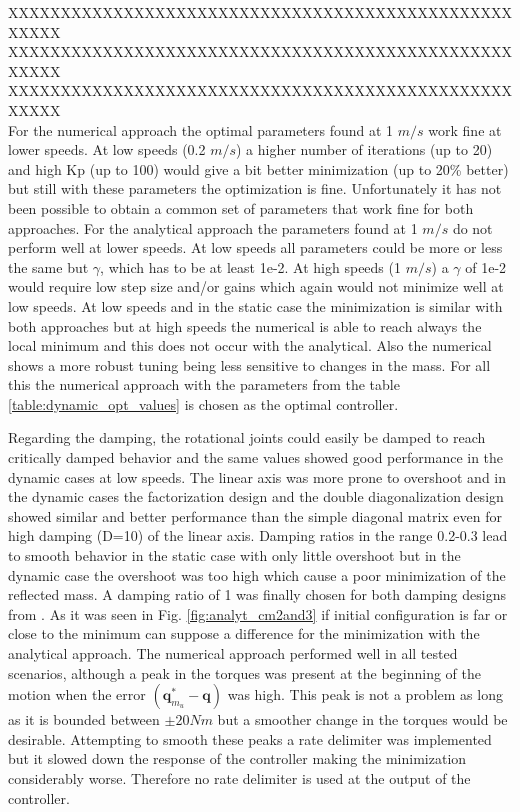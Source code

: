 XXXXXXXXXXXXXXXXXXXXXXXXXXXXXXXXXXXXXXXXXXXXXXXXXXXXX \\ 
XXXXXXXXXXXXXXXXXXXXXXXXXXXXXXXXXXXXXXXXXXXXXXXXXXXXX \\ 
XXXXXXXXXXXXXXXXXXXXXXXXXXXXXXXXXXXXXXXXXXXXXXXXXXXXX \\ 

For the numerical approach the optimal parameters found at 1 $m/s$ work fine at lower speeds. At low speeds (0.2 $m/s$) a higher number of iterations (up to 20) and high Kp (up to 100) would give a bit better minimization (up to 20\% better) but still with these parameters the optimization is fine.
%
Unfortunately it has not been possible to obtain a common set of parameters that work fine for both approaches. For the analytical approach the parameters found at 1 $m/s$ do not perform well at lower speeds. At low speeds all parameters could be more or less the same but $\gamma$, which has to be at least 1e-2. At high speeds (1 $m/s$) a $\gamma$ of 1e-2 would require low step size and/or gains which again would not minimize well at low speeds. 
%
At low speeds and in the static case the minimization is similar with both approaches but at high speeds the numerical is able to reach always the local minimum and this does not occur with the analytical. Also the numerical shows a more robust tuning being less sensitive to changes in the mass. For all this the numerical approach with the parameters from the table \ref{table:dynamic_opt_values} is chosen as the optimal controller.


Regarding the damping, the rotational joints could easily be damped to reach critically damped behavior and the same values showed good performance in the dynamic cases at low speeds. The linear axis was more prone to overshoot and in the dynamic cases the factorization design and the double diagonalization design showed similar and better performance than the simple diagonal matrix even for high damping (D=10) of the linear axis. 
Damping ratios in the range 0.2-0.3 lead to smooth behavior in the static case with only little overshoot but in the dynamic case the overshoot was too high which cause a poor minimization of the reflected mass. A damping ratio of 1 was finally chosen for both damping designs from \cite{alin_damping}.
%
As it was seen in Fig.	\ref{fig:analyt_cm2and3} if initial configuration is far or close to the minimum can suppose a difference for the minimization with the analytical approach. The numerical approach performed well in all tested scenarios, although a peak in the torques was present at the beginning of the motion when the error $(\mathbf{q}_{m_u}^\ast - \mathbf{q})$ was high. This peak is not a problem as long as it is bounded between $\pm 20 Nm$ but a smoother change in the torques would be desirable. Attempting to smooth these peaks a rate delimiter was implemented but it slowed down the response of the controller making the minimization considerably worse. Therefore no rate delimiter is used at the output of the controller.


